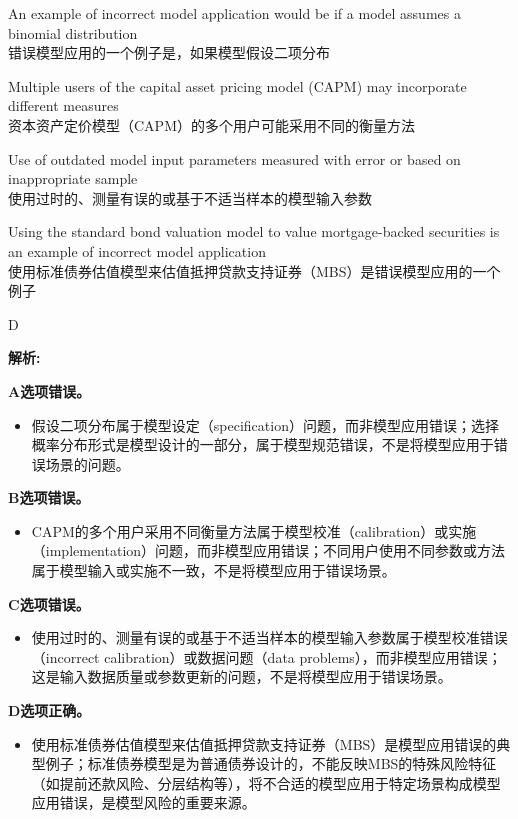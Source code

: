\documentclass{article}
\newenvironment{explanation}
{\textbf{解析:}\par}
{\par}
\begin{document}
\begin{choices}
    \item An example of incorrect model application would be if a model assumes a binomial distribution\\错误模型应用的一个例子是，如果模型假设二项分布
    \item Multiple users of the capital asset pricing model (CAPM) may incorporate different measures\\资本资产定价模型（CAPM）的多个用户可能采用不同的衡量方法
    \item Use of outdated model input parameters measured with error or based on inappropriate sample\\使用过时的、测量有误的或基于不适当样本的模型输入参数
    \item Using the standard bond valuation model to value mortgage-backed securities is an example of incorrect model application\\使用标准债券估值模型来估值抵押贷款支持证券（MBS）是错误模型应用的一个例子
\end{choices}

\begin{correctanswer}
    D
\end{correctanswer}

\begin{explanation}
    \textbf{A选项错误。}
    \begin{itemize}
        \item 假设二项分布属于模型设定（specification）问题，而非模型应用错误；选择概率分布形式是模型设计的一部分，属于模型规范错误，不是将模型应用于错误场景的问题。
    \end{itemize}

    \textbf{B选项错误。}
    \begin{itemize}
        \item CAPM的多个用户采用不同衡量方法属于模型校准（calibration）或实施（implementation）问题，而非模型应用错误；不同用户使用不同参数或方法属于模型输入或实施不一致，不是将模型应用于错误场景。
    \end{itemize}

    \textbf{C选项错误。}
    \begin{itemize}
        \item 使用过时的、测量有误的或基于不适当样本的模型输入参数属于模型校准错误（incorrect calibration）或数据问题（data problems），而非模型应用错误；这是输入数据质量或参数更新的问题，不是将模型应用于错误场景。
    \end{itemize}

    \textbf{D选项正确。}
    \begin{itemize}
        \item 使用标准债券估值模型来估值抵押贷款支持证券（MBS）是模型应用错误的典型例子；标准债券模型是为普通债券设计的，不能反映MBS的特殊风险特征（如提前还款风险、分层结构等），将不合适的模型应用于特定场景构成模型应用错误，是模型风险的重要来源。
    \end{itemize}
\end{explanation}
\end{document}
